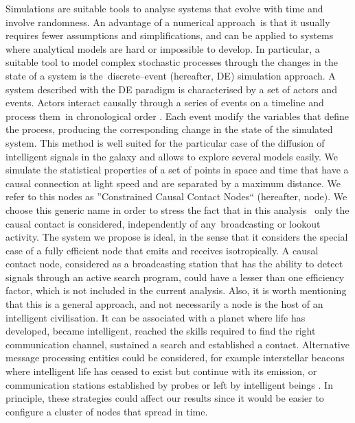 \documentclass[crop]{CSLB}
\newcommand{\ceti}{node}
\newcommand{\cetis}{nodes}
\begin{document}
Simulations are suitable tools to analyse systems that evolve with time and
involve randomness.
%
An advantage of a numerical approach is that it usually requires fewer assumptions
and simplifications, and can be applied to systems where analytical models are
hard or impossible to develop.
%
In particular, a suitable tool to model complex stochastic processes through
the changes in the state of a system is the discrete--event (hereafter, DE)
simulation approach.
%
A system described with the DE paradigm is characterised by a set of actors and
events.
%
Actors interact causally through a series of events on a timeline and process
them in chronological order \citep{ptolemaeus_system_2014,
chung_simulation_2003, ross_simulation_2012}.
%
Each event modify the variables that define the process, producing the
corresponding change in the state of the simulated system.
%
This method is well suited for the particular case of the diffusion of
intelligent signals in the galaxy and allows to explore several models easily.
%
We simulate the statistical properties of a set of points in space and time
that have a causal connection at light speed and are separated
by a maximum distance.
%
We refer to this nodes as ''Constrained Causal Contact Nodes``
(hereafter, \ceti{}).
%
We choose this generic name in order to stress the fact that in this analysis 
only the causal contact is considered, independently of any broadcasting or
lookout activity.
%
The system we propose is ideal, in the sense that it considers the special case
of a fully efficient node that emits and receives isotropically.
%
A causal contact node, considered as a broadcasting station that has the
ability to detect signals through an active search program, could have a
lesser than one efficiency factor, which is not included in the current
analysis.
%
Also, it is worth mentioning that this is a general approach, and not
necessarily a \ceti{} is the host of an intelligent civilisation.
%
It can be associated with a planet where life has developed,
became intelligent, reached the skills required to find the right communication
channel, sustained a search and established a contact.
%
Alternative message processing entities could be considered, for example
interstellar beacons where intelligent life has ceased to exist but continue with its
emission, or communication stations established by probes or left by
intelligent beings \citep[see, e.g., ][]{peters_outer_2018,
barlow_galactic_2013}.
%
In principle, these strategies could affect our results since it would be
easier to configure a cluster of \cetis{} that spread in time.
\end{document}
